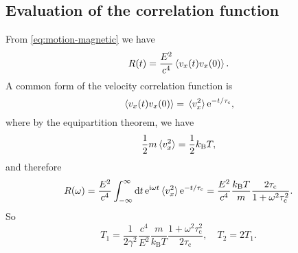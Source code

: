 \documentclass[hyperref, a4paper]{article}
\newcommand*{\ii}{\mathrm{i}}
\newcommand*{\ee}{\mathrm{e}}
\newcommand{\kB}{k_{\text{B}}}
\begin{document}
\subsection{Evaluation of the correlation function}

From \eqref{eq:motion-magnetic} we have 
\begin{equation}
    R(t) = \frac{E^2}{c^4} \expval*{v_x(t) v_x(0)}. 
\end{equation}
A common form of the velocity correlation function is 
\begin{equation}
    \expval*{v_x(t) v_x(0)} = \expval*{v_x^2}  \ee^{- t / \tau_{\text{c}}},
\end{equation}
where by the equipartition theorem, we have 
\begin{equation}
    \frac{1}{2} m \expval*{v_x^2} = \frac{1}{2} \kB T,
\end{equation}
and therefore 
\begin{equation}
    R(\omega) = \frac{E^2}{c^4} \int_{-\infty}^{\infty} \dd{t} \ee^{\ii \omega t} \expval*{v_x^2} \ee^{- t / \tau_{\text{c}}}
    = \frac{E^2}{c^4} \frac{\kB T}{m} \frac{2 \tau_{\text{c}}}{1 + \omega^2 \tau_{\text{c}}^2}.
\end{equation}
So 
\begin{equation}
    T_1 = \frac{1}{2 \gamma^2} \frac{c^4}{E^2} \frac{m}{\kB T} \frac{1 + \omega^2 \tau_{\text{c}}^2}{2 \tau_{\text{c}}} , \quad T_2 = 2 T_1.
\end{equation}

\end{document}
